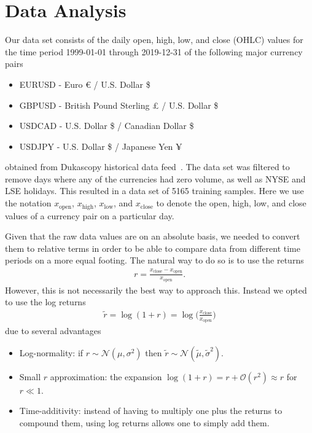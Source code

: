 \section{Data Analysis}
Our data set consists of the daily open, high, low, and close (OHLC) values for the time period 1999-01-01 through 2019-12-31 of the following major currency pairs
\begin{itemize}
    \item EURUSD - Euro € / U.S. Dollar \$
    \item GBPUSD - British Pound Sterling £ / U.S. Dollar \$
    \item USDCAD - U.S. Dollar \$ / Canadian Dollar \$
    \item USDJPY - U.S. Dollar \$ / Japanese Yen ¥
\end{itemize}
obtained from Dukascopy historical data feed~\cite{dukascopy}.
The data set was filtered to remove days where any of the currencies had zero volume, as well as NYSE and LSE holidays.
This resulted in a data set of 5165 training samples.
Here we use the notation \( x_\text{open} \), \( x_\text{high} \), \( x_\text{low} \), and \( x_\text{close} \) to denote the open, high, low, and close values of a currency pair on a particular day.

Given that the raw data values are on an absolute basis, we needed to convert them to relative terms in order to be able to compare data from different time periods on a more equal footing.
The natural way to do so is to use the returns
\begin{align}
    r = \frac{x_\text{close} - x_\text{open}}{x_\text{open}}.
\end{align}
However, this is not necessarily the best way to approach this.
Instead we opted to use the log returns
\begin{align}
    \tilde{r}
        = \log(1+r)
        = \log\bigg( \frac{x_\text{close}}{x_\text{open}} \bigg)
\end{align}
due to several advantages~\cite{quantivity_2012}
\begin{itemize}
    \item Log-normality: if \( r \sim \mathcal{N}(\mu, \sigma^2) \) then \( \tilde{r} \sim \mathcal{N}(\tilde{\mu}, \tilde{\sigma}^2) \).
    \item Small \( r \) approximation: the expansion \( \log (1 + r) = r + \mathcal{O}(r^2) \approx r \) for \( r \ll 1 \).
    \item Time-additivity: instead of having to multiply one plus the returns to compound them, using log returns allows one to simply add them.
\end{itemize}

